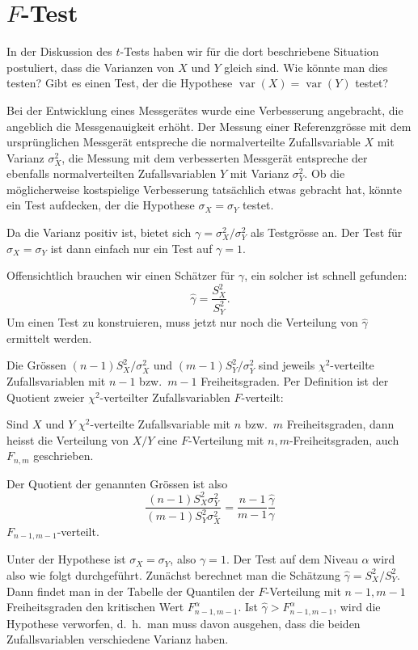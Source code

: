 \section{\texorpdfstring{$F$}{F}-Test}
In der Diskussion des $t$-Tests haben wir für die dort beschriebene
Situation postuliert, dass die Varianzen von $X$ und $Y$ gleich sind.
Wie könnte man dies testen? Gibt es einen Test, der die Hypothese
$\operatorname{var}(X)=\operatorname{var}(Y)$ testet? 

Bei der Entwicklung eines Messgerätes wurde eine Verbesserung angebracht,
die angeblich die Messgenauigkeit erhöht.
Der Messung einer Referenzgrösse
mit dem ursprünglichen Messgerät entspreche die normalverteilte
Zufallsvariable $X$ mit Varianz $\sigma_X^2$, die Messung mit dem verbesserten
Messgerät entspreche der ebenfalls normalverteilten Zufallsvariablen
$Y$ mit Varianz $\sigma_Y^2$.
Ob die möglicherweise kostspielige 
Verbesserung tatsächlich etwas gebracht hat, könnte ein Test aufdecken,
der die Hypothese $\sigma_X=\sigma_Y$ testet.

Da die Varianz positiv ist, bietet sich $\gamma=\sigma_X^2/\sigma_Y^2$ als
Testgrösse an.
Der Test für $\sigma_X=\sigma_Y$ ist dann einfach nur
ein Test auf $\gamma=1$.

Offensichtlich brauchen wir einen Schätzer für $\gamma$, ein solcher ist
schnell gefunden:
\begin{equation}
\hat\gamma=\frac{S_X^2}{S_Y^2}.
\label{ftest-gamma-schaetzer}
\end{equation}
Um einen Test zu konstruieren, muss jetzt nur noch die Verteilung von
$\hat\gamma$ ermittelt werden.

Die Grössen $(n-1)S_X^2/\sigma_X^2$ und $(m-1)S_Y^2/\sigma_Y^2$ sind jeweils
$\chi^2$-verteilte Zufallsvariablen mit $n-1$ bzw.~$m-1$ Freiheitsgraden.
Per Definition ist der Quotient zweier $\chi^2$-verteilter Zufallsvariablen
$F$-verteilt:
\begin{definition}
Sind $X$ und $Y$ $\chi^2$-verteilte Zufallsvariable mit $n$ bzw.~$m$
Freiheitsgraden, dann heisst die Verteilung von $X/Y$ eine $F$-Verteilung
mit $n,m$-Freiheitsgraden, auch $F_{n,m}$ geschrieben.
\end{definition}
Der Quotient der genannten Grössen ist also
\begin{equation}
\frac{(n-1)S_X^2\sigma_Y^2}{(m-1)S_Y^2\sigma_X^2}
=\frac{n-1}{m-1}\frac{\hat\gamma}{\gamma}
\end{equation}
$F_{n-1,m-1}$-verteilt.

Unter der Hypothese ist $\sigma_X=\sigma_Y$, also $\gamma=1$.
Der Test auf dem Niveau $\alpha$ wird also wie folgt durchgeführt.
Zunächst berechnet man die Schätzung $\hat\gamma=S_X^2/S_Y^2$.
Dann
findet man in der Tabelle der Quantilen der $F$-Verteilung mit $n-1,m-1$
Freiheitsgraden den kritischen Wert $F_{n-1,m-1}^\alpha$.
Ist $\hat\gamma>F_{n-1,m-1}^\alpha$, wird die Hypothese verworfen,
d.~h.~man muss davon ausgehen, dass die beiden Zufallsvariablen verschiedene
Varianz haben.

